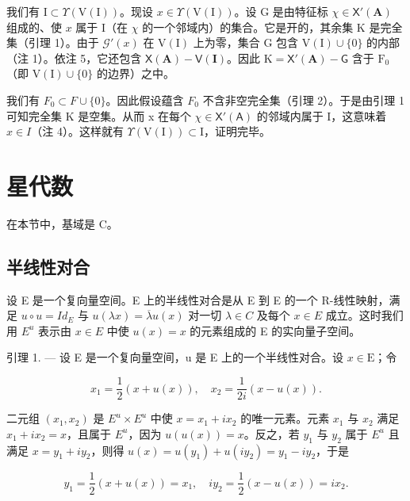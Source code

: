 我们有 \(\mathrm{I} \subset \Upsilon(\mathrm{V}(\mathrm{I}))\)。现设 \(x \in \Upsilon(\mathrm{V}(\mathrm{I}))\)。设 \(\mathrm{G}\) 是由特征标 \(\chi \in \mathsf{X}'(\mathbf{A})\) 组成的、使 \(x\) 属于 \(\mathrm{I}\)（在 \(\chi\) 的一个邻域内）的集合。它是开的，其余集 \(\mathrm{K}\) 是完全集（引理 1）。由于 \(\mathcal{G}'(x)\) 在 \(\mathrm{V}(\mathrm{I})\) 上为零，集合 \(\mathrm{G}\) 包含 \(\mathrm{V}(\mathrm{I}) \cup \{0\}\) 的内部（注 1）。依注 5，它还包含 \(\mathsf{X}(\mathbf{A}) - \mathsf{V}(\mathbf{I})\)。因此 \(\mathrm{K} = \mathsf{X}'(\mathbf{A}) - \mathsf{G}\) 含于 \(\mathrm{F}_0\)（即 \(\mathrm{V}(\mathrm{I}) \cup \{0\}\) 的边界）之中。

我们有 \(F_{0} \subset F \cup \{0\}\)。因此假设蕴含 \(F_{0}\) 不含非空完全集（引理 2）。于是由引理 1 可知完全集 K 是空集。从而 x 在每个 \(\chi \in \mathsf{X}'(\mathsf{A})\) 的邻域内属于 I，这意味着 \(x \in I\)（注 4）。这样就有 \(\Upsilon(\mathrm{V}(\mathrm{I})) \subset \mathrm{I}\)，证明完毕。

\section{星代数}

在本节中，基域是 C。

\subsection{半线性对合}

设 E 是一个复向量空间。E 上的半线性对合是从 E 到 E 的一个 R-线性映射，满足 \(u \circ u = Id_{E}\) 与 \(u(\lambda x) = \overline{\lambda}u(x)\) 对一切 \(\lambda \in C\) 及每个 \(x \in E\) 成立。这时我们用 \(E^{u}\) 表示由 \(x \in E\) 中使 \(u(x) = x\) 的元素组成的 E 的实向量子空间。

引理 1. --- 设 E 是一个复向量空间，u 是 E 上的一个半线性对合。设 \(x \in \mathrm{E}\)；令

\[
x _ {1} = \frac {1}{2} (x + u (x)), \quad x _ {2} = \frac {1}{2 i} (x - u (x)).
\]

二元组 \((x_{1}, x_{2})\) 是 \(E^{u} \times E^{u}\) 中使 \(x = x_{1} + ix_{2}\) 的唯一元素。元素 \(x_{1}\) 与 \(x_{2}\) 满足 \(x_{1} + ix_{2} = x\)，且属于 \(E^{u}\)，因为 \(u(u(x)) = x\)。反之，若 \(y_{1}\) 与 \(y_{2}\) 属于 \(E^{u}\) 且满足 \(x = y_{1} + iy_{2}\)，则得 \(u(x) = u(y_{1}) + u(iy_{2}) = y_{1} - iy_{2}\)，于是

\[
y _ {1} = \frac {1}{2} (x + u (x)) = x _ {1}, \quad i y _ {2} = \frac {1}{2} (x - u (x)) = i x _ {2}.
\]

